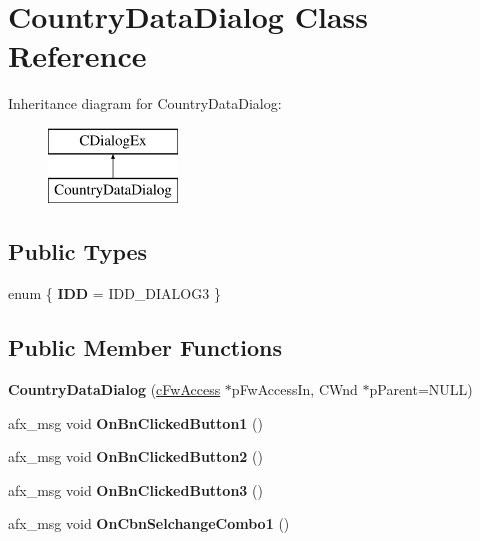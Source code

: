 \hypertarget{class_country_data_dialog}{}\section{Country\+Data\+Dialog Class Reference}
\label{class_country_data_dialog}
Inheritance diagram for Country\+Data\+Dialog\+:\begin{figure}[H]
\begin{center}
\leavevmode
\includegraphics[height=2.000000cm]{class_country_data_dialog}
\end{center}
\end{figure}
\subsection*{Public Types}
\begin{DoxyCompactItemize}
\item 
\hypertarget{class_country_data_dialog_a9a6d29667d309efe43cc761537a1e0ac}{}enum \{ {\bfseries I\+D\+D} = I\+D\+D\+\_\+\+D\+I\+A\+L\+O\+G3
 \}\label{class_country_data_dialog_a9a6d29667d309efe43cc761537a1e0ac}

\end{DoxyCompactItemize}
\subsection*{Public Member Functions}
\begin{DoxyCompactItemize}
\item 
\hypertarget{class_country_data_dialog_a3a7e2efa6917b2261efb3ba84f7099a2}{}{\bfseries Country\+Data\+Dialog} (\hyperlink{classc_fw_access}{c\+Fw\+Access} $\ast$p\+Fw\+Access\+In, C\+Wnd $\ast$p\+Parent=N\+U\+L\+L)\label{class_country_data_dialog_a3a7e2efa6917b2261efb3ba84f7099a2}

\item 
\hypertarget{class_country_data_dialog_aa25b8873198744578c6a68b649e8a314}{}afx\+\_\+msg void {\bfseries On\+Bn\+Clicked\+Button1} ()\label{class_country_data_dialog_aa25b8873198744578c6a68b649e8a314}

\item 
\hypertarget{class_country_data_dialog_afaa4b2211333cdb0f0a9bf881c070c75}{}afx\+\_\+msg void {\bfseries On\+Bn\+Clicked\+Button2} ()\label{class_country_data_dialog_afaa4b2211333cdb0f0a9bf881c070c75}

\item 
\hypertarget{class_country_data_dialog_a64a2d07e544eca3f778871916bc06065}{}afx\+\_\+msg void {\bfseries On\+Bn\+Clicked\+Button3} ()\label{class_country_data_dialog_a64a2d07e544eca3f778871916bc06065}

\item 
\hypertarget{class_country_data_dialog_ab671b7b0d1169a75f2f3a45387dd6809}{}afx\+\_\+msg void {\bfseries On\+Cbn\+Selchange\+Combo1} ()\label{class_country_data_dialog_ab671b7b0d1169a75f2f3a45387dd6809}

\end{DoxyCompactItemize}

